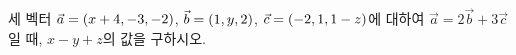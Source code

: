 세 벡터 $\vec{a}=(x+4{,}\mkern3mu\mathopen{}-3{,}\mkern3mu\mathopen{}-2)$, $\vec{b}=(1{,}\mkern3mu\mathopen{}y{,}\mkern3mu\mathopen{}2)$, $\vec{c}=(-2{,}\mkern3mu\mathopen{}1{,}\mkern3mu\mathopen{}1-z)$에 대하여 $\vec{a}=2\vec{b}+3\vec{c}$일 때, $x-y+z$의 값을 구하시오.
